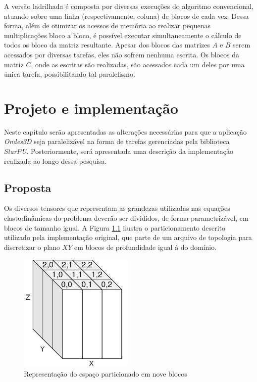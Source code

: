 \documentclass[cic,tc]{iiufrgs}
\begin{document}
A versão ladrilhada é composta por diversas execuções do algoritmo convencional, atuando sobre uma linha (respectivamente, coluna) de blocos de cada vez. Dessa forma, além de otimizar os
acessos de memória ao realizar pequenas multiplicações bloco a bloco, é possível executar simultaneamente o cálculo de todos os bloco da matriz resultante. Apesar dos blocos das matrizes
$A$ e $B$ serem acessados por diversas tarefas, eles não sofrem nenhuma escrita. Os blocos da matriz $C$, onde as escritas são realizadas, são acessados cada um deles por uma única tarefa,
possibilitando tal paralelismo.

\chapter{Projeto e implementação}
Neste capítulo serão apresentadas as alterações necessárias para que a aplicação \textit{Ondes3D} seja paralelizável na forma de tarefas gerenciadas pela biblioteca \textit{StarPU}.
Posteriormente, será apresentada uma descrição da implementação realizada ao longo dessa pesquisa.

\section{Proposta}\label{sec:proposal}

Os diversos tensores que representam as grandezas utilizadas nas equações elastodinâmicas do problema deverão ser divididos, de forma parametrizável, em blocos de tamanho igual.
A Figura \ref{fig:cuboids} ilustra o particionamento descrito utilizado pela implementação original, que parte de um arquivo de topologia para discretizar o plano $XY$ em blocos de profundidade
igual à do domínio.

\begin{figure}[!htb]
    \caption{Representação do espaço particionado em nove blocos}
    \begin{center}
      \includegraphics[width=15em]{cuboids}
    \end{center}
    \label{fig:cuboids}
\end{figure}
\end{document}
